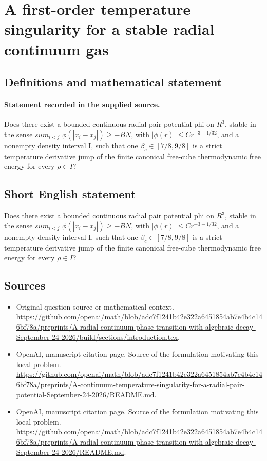 \documentclass[11pt]{article}
\begin{document}
\section*{A first-order temperature singularity for a stable radial continuum gas}\label{statement}
\subsection{Definitions and mathematical statement}
\paragraph{Statement recorded in the supplied source.}
Does there exist a bounded continuous radial pair potential phi on $R^3$, stable in the sense $sum_{i<j}$ $\phi (|x_i-x_j|)\geq -BN$, with $|\phi (r)|\leq Cr^{-3-1/32}$, and a nonempty density interval I, such that one $\beta _c\in [7/8,9/8]$ is a strict temperature derivative jump of the finite canonical free-cube thermodynamic free energy for every $\rho \in I$?
\subsection{Short English statement}
Does there exist a bounded continuous radial pair potential phi on $R^3$, stable in the sense $sum_{i<j}$ $\phi (|x_i-x_j|)\geq -BN$, with $|\phi (r)|\leq Cr^{-3-1/32}$, and a nonempty density interval I, such that one $\beta _c\in [7/8,9/8]$ is a strict temperature derivative jump of the finite canonical free-cube thermodynamic free energy for every $\rho \in I$?
\subsection{Sources}
\begin{itemize}
\item[S1] Original question source or mathematical context.
\url{https://github.com/openai/math/blob/adc7f1241b42e322a6451854ab7e4b4c146bf78a/preprints/A-radial-continuum-phase-transition-with-algebraic-decay-September-24-2026/build/sections/introduction.tex}.
\item[S2] OpenAI, manuscript citation page. Source of the formulation motivating this local problem.
\url{https://github.com/openai/math/blob/adc7f1241b42e322a6451854ab7e4b4c146bf78a/preprints/A-continuum-temperature-singularity-for-a-radial-pair-potential-September-24-2026/README.md}.
\item[S3] OpenAI, manuscript citation page. Source of the formulation motivating this local problem.
\url{https://github.com/openai/math/blob/adc7f1241b42e322a6451854ab7e4b4c146bf78a/preprints/A-radial-continuum-phase-transition-with-algebraic-decay-September-24-2026/README.md}.
\end{itemize}
\end{document}
